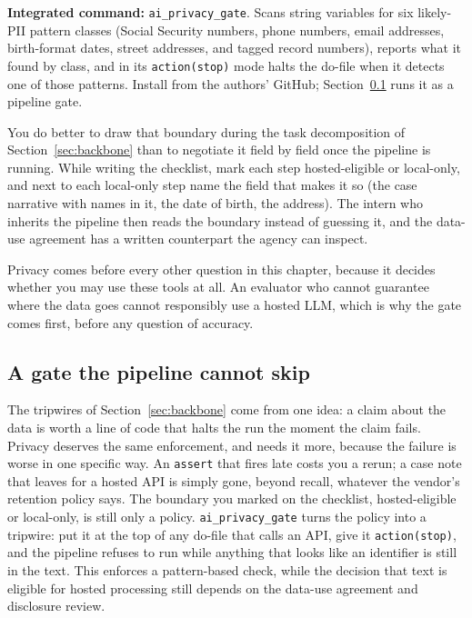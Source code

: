 \begin{kaobox}[frametitle=Package Integration: \texttt{ai\_privacy\_gate}]
\textbf{Integrated command:} \texttt{ai\_privacy\_gate}. Scans string variables for six likely-PII pattern classes (Social Security numbers, phone numbers, email addresses, birth-format dates, street addresses, and tagged record numbers), reports what it found by class, and in its \texttt{action(stop)} mode halts the do-file when it detects one of those patterns. Install from the authors' GitHub; Section~\ref{sec:ch13-aigate} runs it as a pipeline gate.
\end{kaobox}

You do better to draw that boundary during the task decomposition of Section~\ref{sec:backbone} than to negotiate it field by field once the pipeline is running. While writing the checklist, mark each step hosted-eligible or local-only, and next to each local-only step name the field that makes it so (the case narrative with names in it, the date of birth, the address). The intern who inherits the pipeline then reads the boundary instead of guessing it, and the data-use agreement has a written counterpart the agency can inspect.

Privacy comes before every other question in this chapter, because it decides whether you may use these tools at all. An evaluator who cannot guarantee where the data goes cannot responsibly use a hosted LLM, which is why the gate comes first, before any question of accuracy.

\subsection{A gate the pipeline cannot skip}\label{sec:ch13-aigate}
The tripwires of Section~\ref{sec:backbone} come from one idea: a claim about the data is worth a line of code that halts the run the moment the claim fails. Privacy deserves the same enforcement, and needs it more, because the failure is worse in one specific way. An \texttt{assert} that fires late costs you a rerun; a case note that leaves for a hosted API is simply gone, beyond recall, whatever the vendor's retention policy says. The boundary you marked on the checklist, hosted-eligible or local-only, is still only a policy. \texttt{ai\_privacy\_gate} turns the policy into a tripwire: put it at the top of any do-file that calls an API, give it \texttt{action(stop)}, and the pipeline refuses to run while anything that looks like an identifier is still in the text. This enforces a pattern-based check, while the decision that text is eligible for hosted processing still depends on the data-use agreement and disclosure review.

